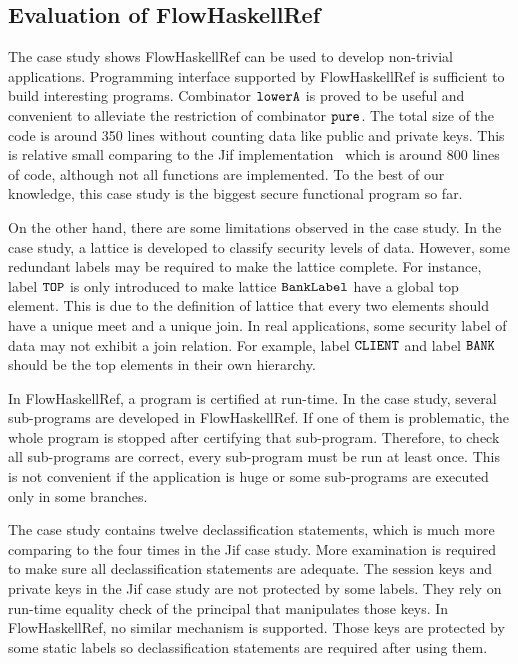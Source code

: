 \documentclass[a4paper]{report}
\newcommand{\co}[1]{$\cod{#1}$}
\begin{document}
\subsection{Evaluation of FlowHaskellRef}
\label{chap6:eval:flowhaskellref}
The case study shows FlowHaskellRef can be used to develop non-trivial applications. Programming
interface supported by FlowHaskellRef is sufficient to build interesting programs. Combinator \co{lowerA}
is proved to be useful and convenient to alleviate the restriction of combinator \co{pure}.
The total size of the code is around 350 lines without counting data like public and private keys.
This is relative small comparing to the Jif implementation~\cite{Tse:Washburn:jif} which is around 800 
lines of code, although not all functions are implemented. To the best of our knowledge, this case
study is the biggest secure functional program so far.

On the other hand, there are some limitations observed in the case study.
In the case study, a lattice is developed to classify security levels of data. However, some
redundant labels may be required to make the lattice complete. For instance, label \co{TOP} is
only introduced to make lattice \co{BankLabel} have a global top element. This is due to the
definition of lattice that every two elements should have a unique meet and a unique join. 
In real applications, some security label of data may not exhibit a join relation. For example, label 
\co{CLIENT} and label \co{BANK} should be the top elements in their own hierarchy. 

In FlowHaskellRef, a program is certified at run-time. In the case study, several sub-programs are developed
in FlowHaskellRef. If one of them is problematic, the whole program is stopped after certifying that sub-program. 
Therefore, to check all sub-programs are correct, every sub-program must be run at least once. This is not
convenient if the application is huge or some sub-programs are executed only in some branches.

The case study contains twelve declassification statements, which is much more comparing to the four times 
in the Jif case study. More examination is required to make sure all declassification statements are adequate.
The session keys and private keys in the Jif case study are not
protected by some labels. They rely on run-time equality check of the principal that manipulates those keys.
In FlowHaskellRef, no similar mechanism is supported. Those keys are protected by some static labels so
declassification statements are required after using them.
\end{document}
